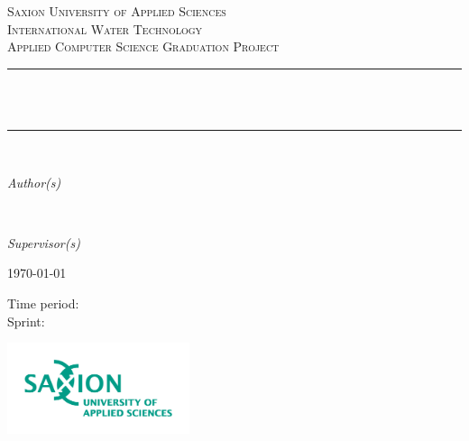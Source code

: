\begin{titlepage}
  	\newcommand{\HRule}{\rule{\linewidth}{0.3mm}}
	\center
	\textsc{\LARGE Saxion University of Applied Sciences}\\[1.5cm]
	\textsc{\Large International Water Technology}\\[0.5cm]
	\textsc{\large Applied Computer Science Graduation Project}\\[0.5cm]
	\HRule\\[0.4cm]
	{\huge\bfseries \@title}\\[0.4cm]
	\HRule\\[1.5cm]

	\begin{minipage}{0.4\textwidth}
		\begin{flushleft}
			\large
			\textit{Author(s)}\\
			\@author %
		\end{flushleft}
	\end{minipage}
	~
	\begin{minipage}{0.4\textwidth}
		\begin{flushright}
			\large
			\textit{Supervisor(s)}\\
			\supervisors
		\end{flushright}
	\end{minipage}
	

	\vfill\vfill
		{\large\today}
    \vfill\vfill
    
    \footnotesize{Time period: \timePeriod}
    \\[0.3cm]
    \footnotesize{Sprint: \sprint}
    \vfill
    \homepage
    
    \vfill
    
    
	
	\vfill\vfill
	\includegraphics[width=0.4\textwidth]{./saxionlogo.png}
	\vfill
	 
	\vfill
	
\end{titlepage}
